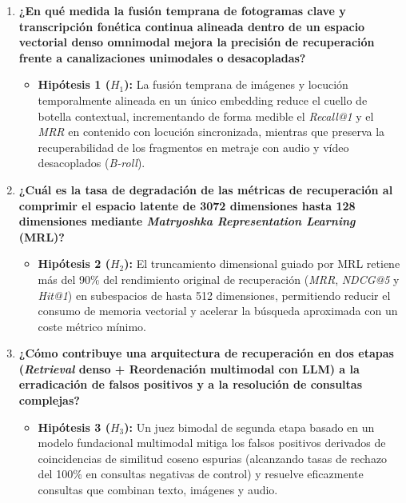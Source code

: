 \begin{enumerate}[label=\textbf{RQ\arabic*:}, wide=0pt, leftmargin=*]
    \item \textbf{¿En qué medida la fusión temprana de fotogramas clave y transcripción fonética continua alineada dentro de un espacio vectorial denso omnimodal mejora la precisión de recuperación frente a canalizaciones unimodales o desacopladas?}
    \begin{itemize}[label=$\hookrightarrow$, leftmargin=1.5em]
        \item \textbf{Hipótesis 1 ($H_1$):} La fusión temprana de imágenes y locución temporalmente alineada en un único embedding reduce el cuello de botella contextual, incrementando de forma medible el \textit{Recall@1} y el \textit{MRR} en contenido con locución sincronizada, mientras que preserva la recuperabilidad de los fragmentos en metraje con audio y vídeo desacoplados (\textit{B-roll}).
    \end{itemize}

    \item \textbf{¿Cuál es la tasa de degradación de las métricas de recuperación al comprimir el espacio latente de 3072 dimensiones hasta 128 dimensiones mediante \textit{Matryoshka Representation Learning} (MRL)?}
    \begin{itemize}[label=$\hookrightarrow$, leftmargin=1.5em]
        \item \textbf{Hipótesis 2 ($H_2$):} El truncamiento dimensional guiado por MRL \cite{kusupati2022matryoshka} retiene más del 90\% del rendimiento original de recuperación (\textit{MRR}, \textit{NDCG@5} y \textit{Hit@1}) en subespacios de hasta 512 dimensiones, permitiendo reducir el consumo de memoria vectorial y acelerar la búsqueda aproximada con un coste métrico mínimo.
    \end{itemize}

    \item \textbf{¿Cómo contribuye una arquitectura de recuperación en dos etapas (\textit{Retrieval} denso + Reordenación multimodal con LLM) a la erradicación de falsos positivos y a la resolución de consultas complejas?}
    \begin{itemize}[label=$\hookrightarrow$, leftmargin=1.5em]
        \item \textbf{Hipótesis 3 ($H_3$):} Un juez bimodal de segunda etapa basado en un modelo fundacional multimodal mitiga los falsos positivos derivados de coincidencias de similitud coseno espurias (alcanzando tasas de rechazo del 100\% en consultas negativas de control) y resuelve eficazmente consultas que combinan texto, imágenes y audio.
    \end{itemize}
\end{enumerate}

